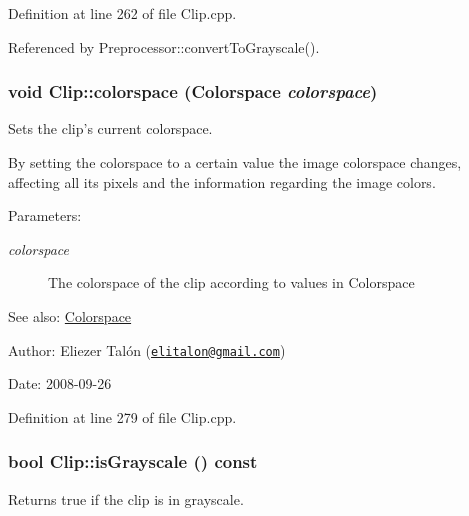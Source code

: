 Definition at line 262 of file Clip.cpp.

Referenced by Preprocessor::convertToGrayscale().\hypertarget{class_clip_7e7fa163b90c573adc424e022235c539}{
\subsubsection[colorspace]{\setlength{\rightskip}{0pt plus 5cm}void Clip::colorspace ({\bf Colorspace} {\em colorspace})}}
\label{class_clip_7e7fa163b90c573adc424e022235c539}


Sets the clip's current colorspace. 

By setting the colorspace to a certain value the image colorspace changes, affecting all its pixels and the information regarding the image colors.

\begin{Desc}
\item[Parameters:]
\begin{description}
\item[{\em colorspace}]The colorspace of the clip according to values in Colorspace\end{description}
\end{Desc}
\begin{Desc}
\item[See also:]\hyperlink{_colorspace_8h_7a7e24cdb2a27271343f0adceff89f65}{Colorspace}\end{Desc}
\begin{Desc}
\item[Author:]Eliezer Talón (\href{mailto:elitalon@gmail.com}{\tt elitalon@gmail.com}) \end{Desc}
\begin{Desc}
\item[Date:]2008-09-26 \end{Desc}


Definition at line 279 of file Clip.cpp.\hypertarget{class_clip_6f8d3a88f89461350228f5e7b7b9d694}{
\subsubsection[isGrayscale]{\setlength{\rightskip}{0pt plus 5cm}bool Clip::isGrayscale () const}}
\label{class_clip_6f8d3a88f89461350228f5e7b7b9d694}


Returns true if the clip is in grayscale. 

